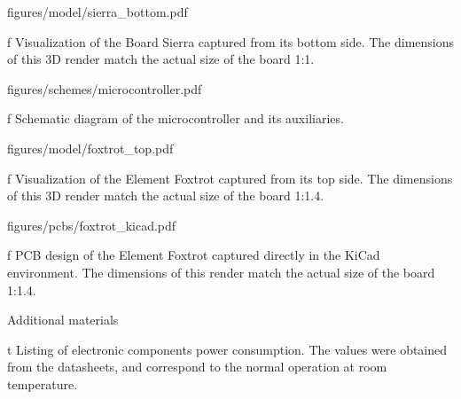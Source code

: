 \midinsert
    \picw=90.17mm \cinspic figures/model/sierra_bottom.pdf
    \caption/f Visualization of the Board Sierra captured from its bottom side. The dimensions of this 3D render match the actual size of the board 1:1.
\endinsert

\midinsert
    \hsize \cinspic figures/schemes/microcontroller.pdf
    \caption/f Schematic diagram of the microcontroller and its auxiliaries.
\endinsert

\midinsert
    \picw=14.5cm \cinspic figures/model/foxtrot_top.pdf
    \caption/f Visualization of the Element Foxtrot captured from its top side. The dimensions of this 3D render match the actual size of the board 1:1.4.
\endinsert

\midinsert
    \picw=14.5cm \cinspic figures/pcbs/foxtrot_kicad.pdf
    \caption/f PCB design of the Element Foxtrot captured directly in the KiCad environment. The dimensions of this render match the actual size of the board 1:1.4.
\endinsert




\app Additional materials

\midinsert {}
    \caption/t Listing of electronic components power consumption. The values were obtained from the datasheets, and correspond to the normal operation at room temperature.
\endinsert

